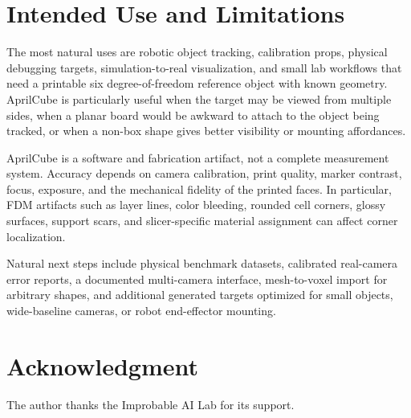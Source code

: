 \documentclass[conference]{IEEEtran}
\begin{document}
\section{Intended Use and Limitations}

The most natural uses are robotic object tracking, calibration props, physical debugging targets, simulation-to-real visualization, and small lab workflows that need a printable six degree-of-freedom reference object with known geometry. AprilCube is particularly useful when the target may be viewed from multiple sides, when a planar board would be awkward to attach to the object being tracked, or when a non-box shape gives better visibility or mounting affordances.

AprilCube is a software and fabrication artifact, not a complete measurement system. Accuracy depends on camera calibration, print quality, marker contrast, focus, exposure, and the mechanical fidelity of the printed faces. In particular, FDM artifacts such as layer lines, color bleeding, rounded cell corners, glossy surfaces, support scars, and slicer-specific material assignment can affect corner localization.

Natural next steps include physical benchmark datasets, calibrated real-camera error reports, a documented multi-camera interface, mesh-to-voxel import for arbitrary shapes, and additional generated targets optimized for small objects, wide-baseline cameras, or robot end-effector mounting.


\section*{Acknowledgment}
The author thanks the Improbable AI Lab for its support.



\end{document}
